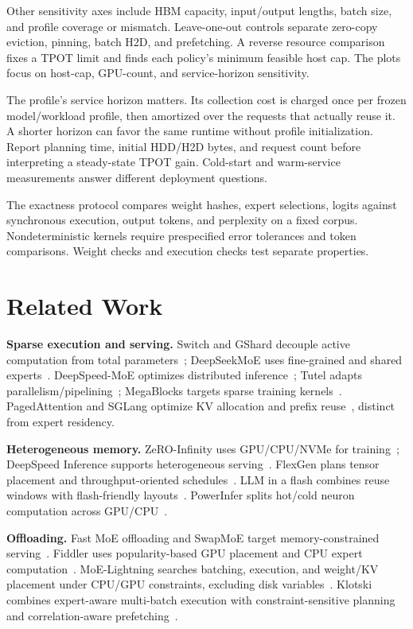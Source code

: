 \documentclass[conference,9pt,letterpaper]{IEEEtran}
\begin{document}
Other sensitivity axes include HBM capacity, input/output lengths, batch size, and profile coverage or mismatch. Leave-one-out controls separate zero-copy eviction, pinning, batch H2D, and prefetching. A reverse resource comparison fixes a TPOT limit and finds each policy's minimum feasible host cap. The plots focus on host-cap, GPU-count, and service-horizon sensitivity.

The profile's service horizon matters. Its collection cost is charged once per frozen model/workload profile, then amortized over the requests that actually reuse it. A shorter horizon can favor the same runtime without profile initialization. Report planning time, initial HDD/H2D bytes, and request count before interpreting a steady-state TPOT gain. Cold-start and warm-service measurements answer different deployment questions.

The exactness protocol compares weight hashes, expert selections, logits against synchronous execution, output tokens, and perplexity on a fixed corpus. Nondeterministic kernels require prespecified error tolerances and token comparisons. Weight checks and execution checks test separate properties.

\section{Related Work}
\label{sec:related}
\textbf{Sparse execution and serving.} Switch and GShard decouple active computation from total parameters~\cite{switch,gshard}; DeepSeekMoE uses fine-grained and shared experts~\cite{deepseekmoe}. DeepSpeed-MoE optimizes distributed inference~\cite{deepspeedmoe}; Tutel adapts parallelism/pipelining~\cite{tutel}; MegaBlocks targets sparse training kernels~\cite{megablocks}. PagedAttention and SGLang optimize KV allocation and prefix reuse~\cite{pagedattention,sglang}, distinct from expert residency.

\textbf{Heterogeneous memory.} ZeRO-Infinity uses GPU/CPU/NVMe for training~\cite{zeroinfinity}; DeepSpeed Inference supports heterogeneous serving~\cite{dsinference}. FlexGen plans tensor placement and throughput-oriented schedules~\cite{flexgen}. LLM in a flash combines reuse windows with flash-friendly layouts~\cite{llmflash}. PowerInfer splits hot/cold neuron computation across GPU/CPU~\cite{powerinfer}.

\textbf{Offloading.} Fast MoE offloading and SwapMoE target memory-constrained serving~\cite{offloading,swapmoe}. Fiddler uses popularity-based GPU placement and CPU expert computation~\cite{fiddler}. MoE-Lightning searches batching, execution, and weight/KV placement under CPU/GPU constraints, excluding disk variables~\cite{lightning}. Klotski combines expert-aware multi-batch execution with constraint-sensitive planning and correlation-aware prefetching~\cite{klotski}.
\end{document}
